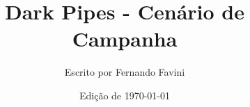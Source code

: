 \documentclass[twocolumn,a4paper,11pt, titlepage, openany]{book}
\begin{document}
\title{Dark Pipes - Cen\'ario de Campanha}

\author{Escrito por Fernando Favini}

\date{Edi\c{c}\~ao de \today}

\maketitle
\begin{multicols}{3}
\tableofcontents
\end{multicols}
\newpage

\end{document}
